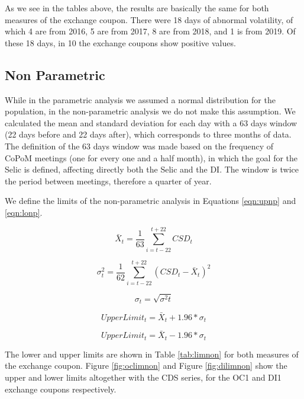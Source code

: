 \documentclass[cic,tc, english]{iiufrgs}
\begin{document}
    

    As we see in the tables above, the results are basically the same for both measures of the exchange coupon. There were 18 days of abnormal volatility, of which 4 are from 2016, 5 are from 2017, 8 are from 2018, and 1 is from 2019. Of these 18 days, in 10 the exchange coupons show positive values.


\subsection{Non Parametric}

    While in the parametric analysis we assumed a normal distribution for the population, in the non-parametric analysis we do not make this assumption. We calculated the mean and standard deviation for each day with a 63 days window (22 days before and 22 days after), which corresponds to three months of data. The definition of the 63 days window was made based on the frequency of CoPoM meetings (one for every one and a half month), in which the goal for the Selic is defined, affecting directly both the Selic and the DI. The window is twice the period between meetings, therefore a quarter of year.

    We define the limits of the non-parametric analysis in Equations \ref{eqn:upnp} and \ref{eqn:lonp}.

    $$\bar{X}_t = \frac{1}{63} \displaystyle\sum_{i=t-22}^{t+22} CSD_t$$

    $$\sigma^2_t = \frac{1}{62} \displaystyle\sum_{i=t-22}^{t+22} (CSD_t - \bar{X}_t)^2$$

    $$\sigma_t = \sqrt{\sigma^2t}$$

    \begin{equation}
        \label{eqn:upnp}
        UpperLimit_t = \bar{X}_t + 1.96 * \sigma_t
    \end{equation}

    \begin{equation}
        \label{eqn:lonp}
        UpperLimit_t = \bar{X}_t - 1.96 * \sigma_t
    \end{equation}

    The lower and upper limits are shown in Table \ref{tab:limnon} for both measures of the exchange coupon. Figure \ref{fig:oclimnon} and Figure \ref{fig:dilimnon} show the upper and lower limits altogether with the CDS series, for the OC1 and DI1 exchange coupons respectively.

    
\end{document}
